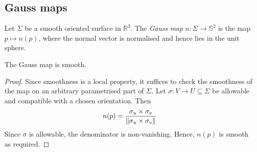 \subsection{Gauss maps}
\begin{definition}
	Let \( \Sigma \) be a smooth oriented surface in \( \mathbb R^3 \).
	The \textit{Gauss map} \( n \colon \Sigma \to \mathbb S^2 \) is the map \( p \mapsto n(p) \), where the normal vector is normalised and hence lies in the unit sphere.
\end{definition}
\begin{lemma}
	The Gauss map is smooth.
\end{lemma}
\begin{proof}
	Since smoothness is a local property, it suffices to check the smoothness of the map on an arbitrary parametrised part of \( \Sigma \).
	Let \( \sigma \colon V \to U \subseteq \Sigma \) be allowable and compatible with a chosen orientation.
	Then
	\[ n(p) = \frac{\sigma_u \times \sigma_v}{\norm{\sigma_u \times \sigma_v}} \]
	Since \( \sigma \) is allowable, the denominator is non-vanishing.
	Hence, \( n(p) \) is smooth as required.
\end{proof}
